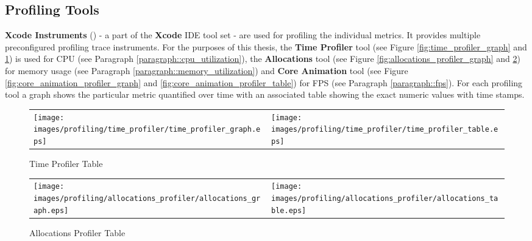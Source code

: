 \subsection{Profiling Tools} \label{subsection::profiling_tooling}
\textbf{Xcode Instruments} (\cite{Apple2019}) - a part of the \textbf{Xcode} IDE tool set - are used for profiling the individual metrics. It provides multiple preconfigured
profiling trace instruments.
For the purposes of this thesis, the \textbf{Time Profiler} tool (see Figure \ref{fig:time_profiler_graph} and \ref{fig:time_profiler_table}) is used for CPU (see Paragraph \ref{paragraph::cpu_utilization}),
the \textbf{Allocations} tool (see Figure \ref{fig:allocations_profiler_graph} and \ref{fig:allocations_profiler_table}) for memory usage (see Paragraph \ref{paragraph::memory_utilization}) and \textbf{Core Animation} tool (see Figure \ref{fig:core_animation_profiler_graph} and \ref{fig:core_animation_profiler_table}) for FPS (see Paragraph \ref{paragraph::fps}).
For each profiling tool a graph shows the particular metric quantified over time with an associated table showing the exact numeric values with time stamps.

\begin{figure}[htbp]
    \begin{tabular}{p{}p{}}
        \begin{minipage}{.5\textwidth}
        \centering
        \texttt{[image: images/profiling/time\_profiler/time\_profiler\_graph.eps]}
        \caption{Time Profiler Graph}
        \label{fig:time_profiler_graph}
        \end{minipage}
        &
        \begin{minipage}{.5\textwidth}
            \centering
            \texttt{[image: images/profiling/time\_profiler/time\_profiler\_table.eps]}
            \caption{Time Profiler Table}
            \label{fig:time_profiler_table}
        \end{minipage}
    \end{tabular}
\end{figure}

\begin{figure}[htbp]
    \begin{tabular}{p{}p{}}
        \begin{minipage}{.5\textwidth}
        \centering
        \texttt{[image: images/profiling/allocations\_profiler/allocations\_graph.eps]}
        \caption{Allocations Profiler Graph}
        \label{fig:allocations_profiler_graph}
        \end{minipage}
        &
        \begin{minipage}{.5\textwidth}
            \centering
            \texttt{[image: images/profiling/allocations\_profiler/allocations\_table.eps]}
            \caption{Allocations Profiler Table}
            \label{fig:allocations_profiler_table}
        \end{minipage}
    \end{tabular}
\end{figure}

